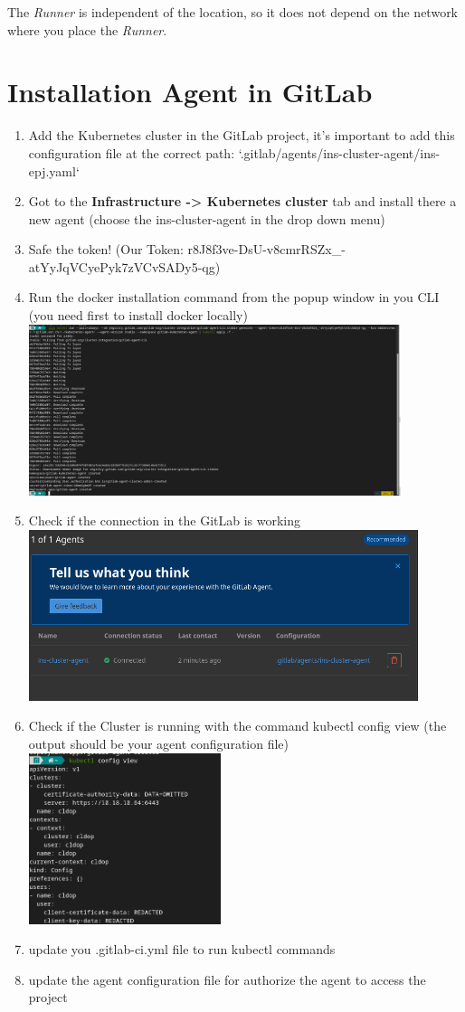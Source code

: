 The \textit{Runner} is independent of the location, so it does not depend on the network where you place the \textit{Runner}.

\section{Installation Agent in GitLab}
\begin{enumerate}
    \item Add the Kubernetes cluster in the GitLab project, it's important to add this configuration file at the correct path: `.gitlab/agents/ins-cluster-agent/ins-epj.yaml`
    \item Got to the \textbf{Infrastructure -> Kubernetes cluster} tab and install there a new agent (choose the ins-cluster-agent in the drop down menu)
    \item Safe the token! (Our Token: r8J8f3ve-DsU-v8cmrRSZx\_-atYyJqVCyePyk7zVCvSADy5-qg)
    \item Run the docker installation command from the popup window in you CLI (you need first to install docker locally)
    \includegraphics[height=5cm]{resources/agent-installation.png}
    \item Check if the connection in the GitLab is working
    \includegraphics[height=5cm]{resources/ins-cluster-agent-connection.png}
    \item Check if the Cluster is running with the command kubectl config view (the output should be your agent configuration file)
    \includegraphics[height=5cm]{resources/ins-cluster-agent-accessing-cluster-test.png}
    \item update you .gitlab-ci.yml file to run kubectl commands
    \item update the agent configuration file for authorize the agent to access the project
\end{enumerate}